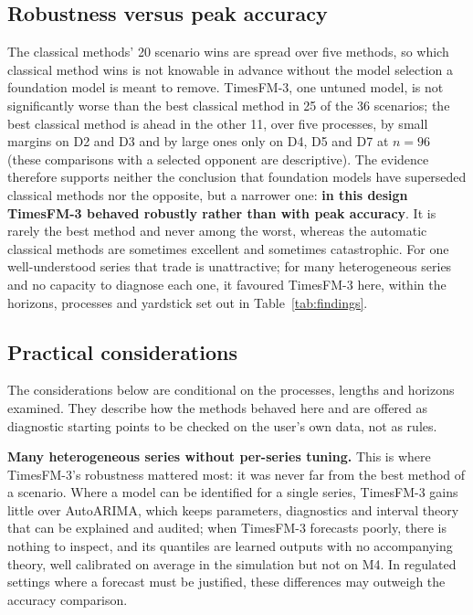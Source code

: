 \documentclass[ASNA]{USG}
\providecommand{\tableref}[1]{Table~\ref{#1}}
\begin{document}
\subsection{Robustness versus peak accuracy}
\label{sec:tradeoff}

The classical methods' 20 scenario wins are spread over five methods, so which classical method wins is not
knowable in advance without the model selection a foundation model is meant to remove. TimesFM-3, one
untuned model, is not significantly worse than the best classical method in 25 of the 36 scenarios; the best
classical method is ahead in the other 11, over five processes, by small margins on D2 and D3 and by large
ones only on D4, D5 and D7 at $n = 96$ (these comparisons with a selected opponent are descriptive). The
evidence therefore supports neither the conclusion that foundation models have superseded classical methods
nor the opposite, but a narrower one: \textbf{in this design TimesFM-3 behaved robustly rather than with peak
accuracy}. It is rarely the best method and never among the worst, whereas the automatic classical methods
are sometimes excellent and sometimes catastrophic. For one well-understood series that trade is
unattractive; for many heterogeneous series and no capacity to diagnose each one, it favoured TimesFM-3 here,
within the horizons, processes and yardstick set out in \tableref{tab:findings}.

\subsection{Practical considerations}
\label{sec:practical}

The considerations below are conditional on the processes, lengths and horizons examined. They describe how
the methods behaved here and are offered as diagnostic starting points to be checked on the user's own
data, not as rules.

\textbf{Many heterogeneous series without per-series tuning.} This is where TimesFM-3's robustness mattered
most: it was never far from the best method of a scenario. Where a model can be identified for a single series,
TimesFM-3 gains little over AutoARIMA, which keeps parameters, diagnostics and interval theory that
can be explained and audited; when TimesFM-3 forecasts poorly, there is nothing to inspect, and its quantiles
are learned outputs with no accompanying theory, well calibrated on average in the simulation but not on M4.
In regulated settings where a forecast must be justified, these differences may outweigh the accuracy
comparison.
\end{document}
